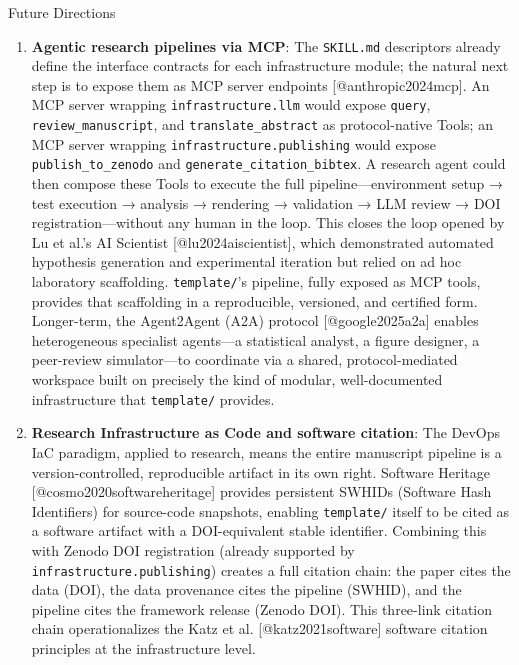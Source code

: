 \documentclass[
  ignorenonframetext,
]{beamer}
\begin{document}
\begin{frame}[fragile]{Future Directions}
\begin{enumerate}
  Thin Orchestrator pattern---verifying that scripts contain no
  algorithmic logic and that \texttt{src/} modules do not import from
  \texttt{scripts/}.
\item
  \textbf{Agentic research pipelines via MCP}: The \texttt{SKILL.md}
  descriptors already define the interface contracts for each
  infrastructure module; the natural next step is to expose them as MCP
  server endpoints {[}@anthropic2024mcp{]}. An MCP server wrapping
  \texttt{infrastructure.llm} would expose \texttt{query},
  \texttt{review\_manuscript}, and \texttt{translate\_abstract} as
  protocol-native Tools; an MCP server wrapping
  \texttt{infrastructure.publishing} would expose
  \texttt{publish\_to\_zenodo} and \texttt{generate\_citation\_bibtex}.
  A research agent could then compose these Tools to execute the full
  pipeline---environment setup → test execution → analysis → rendering →
  validation → LLM review → DOI registration---without any human in the
  loop. This closes the loop opened by Lu et al.'s AI Scientist
  {[}@lu2024aiscientist{]}, which demonstrated automated hypothesis
  generation and experimental iteration but relied on ad hoc laboratory
  scaffolding. \texttt{template/}'s pipeline, fully exposed as MCP
  tools, provides that scaffolding in a reproducible, versioned, and
  certified form. Longer-term, the Agent2Agent (A2A) protocol
  {[}@google2025a2a{]} enables heterogeneous specialist agents---a
  statistical analyst, a figure designer, a peer-review simulator---to
  coordinate via a shared, protocol-mediated workspace built on
  precisely the kind of modular, well-documented infrastructure that
  \texttt{template/} provides.
\item
  \textbf{Research Infrastructure as Code and software citation}: The
  DevOps IaC paradigm, applied to research, means the entire manuscript
  pipeline is a version-controlled, reproducible artifact in its own
  right. Software Heritage {[}@cosmo2020softwareheritage{]} provides
  persistent SWHIDs (Software Hash Identifiers) for source-code
  snapshots, enabling \texttt{template/} itself to be cited as a
  software artifact with a DOI-equivalent stable identifier. Combining
  this with Zenodo DOI registration (already supported by
  \texttt{infrastructure.publishing}) creates a full citation chain: the
  paper cites the data (DOI), the data provenance cites the pipeline
  (SWHID), and the pipeline cites the framework release (Zenodo DOI).
  This three-link citation chain operationalizes the Katz et al.
  {[}@katz2021software{]} software citation principles at the
  infrastructure level.
\end{enumerate}
\end{frame}
\end{document}
